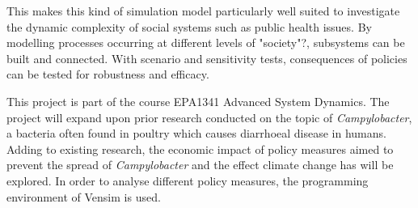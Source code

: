 This makes this kind of simulation model particularly well suited to investigate the dynamic complexity of social systems such as public health issues. By modelling processes occurring at different levels of "society"?, subsystems can be built and connected. With scenario and sensitivity tests, consequences of policies can be tested for robustness and efficacy. 


This project is part of the course EPA1341 Advanced System Dynamics. The project will expand upon prior research conducted on the topic of \textit{Campylobacter}, a bacteria often found in poultry which causes diarrhoeal disease in humans. Adding to existing research, the economic impact of policy measures aimed to prevent the spread of  \textit{Campylobacter} and the effect climate change has will be explored. In order to analyse different policy measures, the programming environment of Vensim is used. 